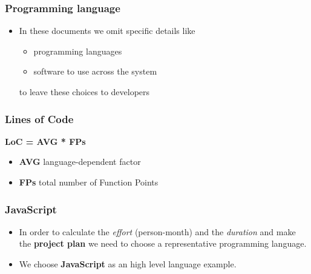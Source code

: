 
\begin{frame}
	\frametitle{Programming language}
	\begin{itemize}	
		\item In these documents we omit specific details like
			\begin{itemize}
				\item programming languages
				\item software to use across the system
			\end{itemize}
			to leave these choices to developers
	\end{itemize}
\end{frame}

\begin{frame}
	\frametitle{Lines of Code}
	\begin{center}
		\textbf{LoC = AVG * FPs}
	\end{center}
	\pause
	\begin{itemize}
		\item \textbf{AVG} language-dependent factor
		\item \textbf{FPs} total number of Function Points
	\end{itemize}
\end{frame}

\begin{frame}
	\frametitle{JavaScript}
	\begin{itemize}
		\item 	In order to calculate the \textit{effort} (person-month) and the \textit{duration} and make the \textbf{project plan} we need to choose a representative programming language.
		\item We choose \textbf{JavaScript} as an high level language example. 
	\end{itemize}

\end{frame}
